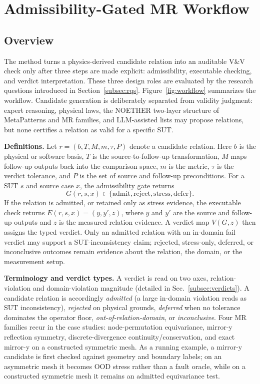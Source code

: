 \documentclass[preprint,12pt,authoryear]{elsarticle}
\begin{document}
\section{Admissibility-Gated MR Workflow}
\label{sec:method}

\subsection{Overview}
\label{subsec:method-overview}

The method turns a physics-derived candidate relation into an auditable V\&V check only after three steps are made explicit: admissibility, executable checking, and verdict interpretation. These three design roles are evaluated by the research questions introduced in Section~\ref{subsec:rqs}. Figure~\ref{fig:workflow} summarizes the workflow. Candidate generation is deliberately separated from validity judgment: expert reasoning, physical laws, the NOETHER two-layer structure of MetaPatterns and MR families, and LLM-assisted lists may propose relations, but none certifies a relation as valid for a specific SUT.

\textbf{Definitions.} Let \(r=(b,T,M,m,\tau,P)\) denote a candidate relation. Here \(b\) is the physical or software basis, \(T\) is the source-to-follow-up transformation, \(M\) maps follow-up outputs back into the comparison space, \(m\) is the metric, \(\tau\) is the verdict tolerance, and \(P\) is the set of source and follow-up preconditions. For a SUT \(s\) and source case \(x\), the admissibility gate returns
\[
G(r,s,x)\in\{\mathrm{admit},\mathrm{reject},\mathrm{stress},\mathrm{defer}\}.
\]
If the relation is admitted, or retained only as stress evidence, the executable check returns \(E(r,s,x)=(y,y',z)\), where \(y\) and \(y'\) are the source and follow-up outputs and \(z\) is the measured relation evidence. A verdict map \(V(G,z)\) then assigns the typed verdict. Only an admitted relation with an in-domain fail verdict may support a SUT-inconsistency claim; rejected, stress-only, deferred, or inconclusive outcomes remain evidence about the relation, the domain, or the measurement setup.

\textbf{Terminology and verdict types.} A verdict is read on two axes, relation-violation and domain-violation magnitude (detailed in Sec.~\ref{subsec:verdicts}). A candidate relation is accordingly \emph{admitted} (a large in-domain violation reads as SUT inconsistency), \emph{rejected} on physical grounds, \emph{deferred} when no tolerance dominates the operator floor, \emph{out-of-relation-domain}, or \emph{inconclusive}. Four MR families recur in the case studies: node-permutation equivariance, mirror-y reflection symmetry, discrete-divergence continuity/conservation, and exact mirror-y on a constructed symmetric mesh. As a running example, a mirror-y candidate is first checked against geometry and boundary labels; on an asymmetric mesh it becomes OOD stress rather than a fault oracle, while on a constructed symmetric mesh it remains an admitted equivariance test.
\end{document}

